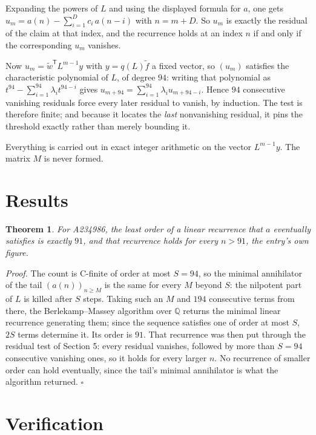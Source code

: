 \documentclass[11pt]{article}
\newtheorem{theorem}{Theorem}
\theoremstyle{definition}
\begin{document}
Expanding the powers of $L$ and using the displayed formula for $a$, one gets $u_m = a(n) - \sum_{i=1}^{D} c_i\,a(n-i)$ with $n = m + D$. So $u_m$ is exactly the residual of the claim at that index, and the recurrence holds at an index $n$ if and only if the corresponding $u_m$ vanishes.

Now $u_m = \tilde w^{\mathsf T} L^{m-1} y$ with $y = q(L)\tilde f$ a fixed vector, so $(u_m)$ satisfies the characteristic polynomial of $L$, of degree $94$: writing that polynomial as $t^{94} - \sum_{i=1}^{94} \lambda_i t^{94-i}$ gives $u_{m+94} = \sum_{i=1}^{94} \lambda_i u_{m+94-i}$. Hence $94$ consecutive vanishing residuals force every later residual to vanish, by induction. The test is therefore finite; and because it locates the {\itshape last} nonvanishing residual, it pins the threshold exactly rather than merely bounding it.

Everything is carried out in exact integer arithmetic on the vector $L^{m-1}y$. The matrix $M$ is never formed.

\section{Results}

\begin{theorem} For A234986, the least order of a linear recurrence that $a$ eventually satisfies is exactly $91$, and that recurrence holds for every $n > 91$, the entry's own figure.\end{theorem}

{\itshape Proof.} The count is C-finite of order at most $S = 94$, so the minimal annihilator of the tail $(a(n))_{n \ge M}$ is the same for every $M$ beyond $S$: the nilpotent part of $L$ is killed after $S$ steps. Taking such an $M$ and $194$ consecutive terms from there, the Berlekamp--Massey algorithm over $\mathbb{Q}$ returns the minimal linear recurrence generating them; since the sequence satisfies one of order at most $S$, $2S$ terms determine it. Its order is $91$. That recurrence was then put through the residual test of Section 5: every residual vanishes, followed by more than $S = 94$ consecutive vanishing ones, so it holds for every larger $n$. No recurrence of smaller order can hold eventually, since the tail's minimal annihilator is what the algorithm returned. $\square$

\section{Verification}
\end{document}
